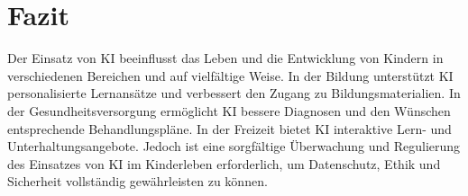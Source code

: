 \documentclass{article}
\begin{document}
\section{Fazit}

Der Einsatz von KI beeinflusst das Leben und die Entwicklung von Kindern in verschiedenen Bereichen und auf vielfältige Weise. In der Bildung unterstützt KI personalisierte Lernansätze und verbessert den Zugang zu Bildungsmaterialien. In der Gesundheitsversorgung ermöglicht KI bessere Diagnosen und den Wünschen entsprechende Behandlungspläne. In der Freizeit bietet KI interaktive Lern- und Unterhaltungsangebote. 
Jedoch ist eine sorgfältige Überwachung und Regulierung des Einsatzes von KI im Kinderleben erforderlich, um Datenschutz, Ethik und Sicherheit vollständig gewährleisten zu können. 



\printbibliography
\end{document}
